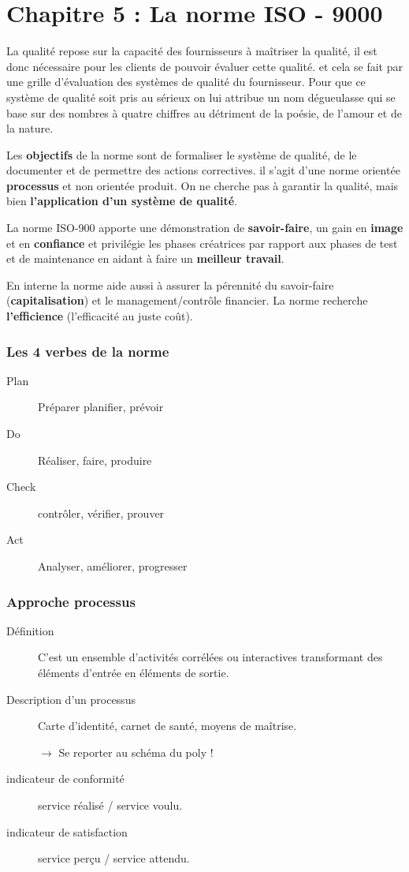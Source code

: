 \part{Chapitre 5 : La norme ISO - 9000}

La qualité repose sur la capacité des fournisseurs à maîtriser la qualité, il est donc nécessaire pour les clients de pouvoir évaluer cette qualité. et cela se fait par une grille d’évaluation des systèmes de qualité du fournisseur. Pour que ce système de qualité soit pris au sérieux on lui attribue un nom dégueulasse qui se base sur des nombres à quatre chiffres au détriment de la poésie, de l’amour et de la nature. %

Les \textbf{objectifs} de la norme sont de formaliser le système de qualité, de le documenter et de permettre des actions correctives. il s’agit d’une norme orientée \textbf{processus} et non orientée produit. On ne cherche pas à garantir la qualité, mais bien \textbf{l’application d’un système de qualité}.

La norme ISO-900 apporte une démonstration de \textbf{savoir-faire}, un gain en \textbf{image} et en \textbf{confiance} et privilégie les phases créatrices par rapport aux phases de test et de maintenance en aidant à faire un \textbf{meilleur travail}.

En interne la norme aide aussi à assurer la pérennité du savoir-faire (\textbf{capitalisation}) et le management/contrôle financier. La norme recherche \textbf{l'efficience} (l'efficacité au juste coût).

\section{Les 4 verbes de la norme}
\begin{description}
	\item[Plan] Préparer planifier, prévoir
	\item[Do] Réaliser, faire, produire
	\item[Check] contrôler, vérifier, prouver
	\item[Act] Analyser, améliorer, progresser
\end{description}



\section{Approche processus}
\begin{description}
	\item[Définition] C’est un ensemble d'activités corrélées ou interactives transformant des éléments d'entrée en éléments de sortie.
	\item[Description d’un processus] Carte d'identité, carnet de santé, moyens de maîtrise.

$\rightarrow$ Se reporter au schéma du poly !

\item[indicateur de conformité] service réalisé / service voulu.
\item[indicateur de satisfaction] service perçu / service attendu.
\end{description}

